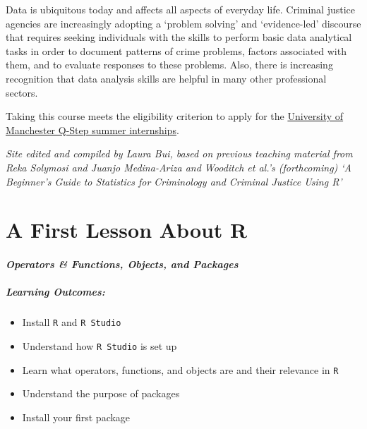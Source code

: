 \documentclass[
]{book}
\providecommand{\tightlist}{%
  \setlength{\itemsep}{0pt}\setlength{\parskip}{0pt}}
\begin{document}
Data is ubiquitous today and affects all aspects of everyday life. Criminal justice agencies are increasingly adopting a `problem solving' and `evidence-led' discourse that requires seeking individuals with the skills to perform basic data analytical tasks in order to document patterns of crime problems, factors associated with them, and to evaluate responses to these problems. Also, there is increasing recognition that data analysis skills are helpful in many other professional sectors.

Taking this course meets the eligibility criterion to apply for the \href{https://www.humanities.manchester.ac.uk/q-step/internships/}{University of Manchester Q-Step summer internships}.

\emph{Site edited and compiled by Laura Bui, based on previous teaching material from Reka Solymosi and Juanjo Medina-Ariza and Wooditch et al.'s (forthcoming) `A Beginner's Guide to Statistics for Criminology and Criminal Justice Using R'}

\hypertarget{a-first-lesson-about-r}{%
\chapter{A First Lesson About R}\label{a-first-lesson-about-r}}

\hypertarget{operators-functions-objects-and-packages}{%
\subsubsection*{\texorpdfstring{\emph{Operators \& Functions, Objects, and Packages}}{Operators \& Functions, Objects, and Packages}}\label{operators-functions-objects-and-packages}}

\hypertarget{learning-outcomes}{%
\paragraph*{\texorpdfstring{\textbf{Learning Outcomes:}}{Learning Outcomes:}}\label{learning-outcomes}}

\begin{itemize}
\tightlist
\item
  Install \texttt{R} and \texttt{R\ Studio}
\item
  Understand how \texttt{R\ Studio} is set up
\item
  Learn what operators, functions, and objects are and their relevance in \texttt{R}
\item
  Understand the purpose of packages
\item
  Install your first package
\end{itemize}
\end{document}
